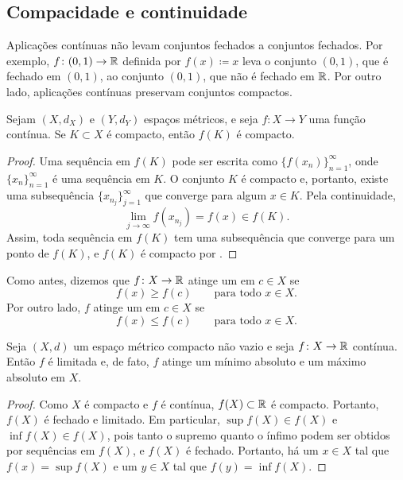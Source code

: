 \subsection{Compacidade e continuidade}

Aplicações contínuas não levam conjuntos fechados a conjuntos fechados. Por exemplo,
$f \colon (0,1) \to {\mathbb{R}}$ definida por $f(x) \coloneqq x$ leva o conjunto $(0,1)$, que
é fechado em $(0,1)$, ao conjunto $(0,1)$, que não é fechado em ${\mathbb{R}}$.
Por outro lado, aplicações contínuas preservam conjuntos compactos.

\begin{lemma} \label{lemma:continuouscompact}
Sejam $(X,d_X)$ e $(Y,d_Y)$ espaços métricos,
e seja $f \colon X \to Y$ uma função contínua. Se
$K \subset X$ é compacto, então $f(K)$ é compacto.
\end{lemma}

\begin{proof}
Uma sequência em $f(K)$ pode ser escrita como
$\bigl\{ f(x_n) \bigr\}_{n=1}^\infty$, onde
$\{ x_n \}_{n=1}^\infty$ é uma sequência em $K$. O conjunto $K$ é compacto e,
portanto, existe uma subsequência
$\{ x_{n_j} \}_{j=1}^\infty$ que converge para algum $x \in K$.
Pela continuidade,
\begin{equation*}
\lim_{j\to\infty} f(x_{n_j}) = f(x) \in f(K) .
\end{equation*}
Assim, toda sequência em $f(K)$ tem uma subsequência que converge
para um ponto de $f(K)$, e $f(K)$ é compacto por .
\end{proof}

Como antes, dizemos que $f \colon X \to {\mathbb{R}}$ atinge um
\emph{} em $c \in X$ se
\begin{equation*}
f(x) \geq f(c) \qquad \text{para todo } x \in X.
\end{equation*}
Por outro lado, $f$ atinge um
\emph{} em $c \in X$ se
\begin{equation*}
f(x) \leq f(c) \qquad \text{para todo } x \in X.
\end{equation*}

\begin{thm}
Seja $(X,d)$ um espaço métrico compacto não vazio
e seja $f \colon X \to {\mathbb{R}}$ contínua. Então
$f$ é limitada e, de fato,
$f$ atinge um mínimo absoluto e um máximo absoluto em $X$.
\end{thm}

\begin{proof}
Como $X$ é compacto e $f$ é contínua,
$f(X) \subset {\mathbb{R}}$ é compacto. Portanto, $f(X)$ é fechado
e limitado. Em particular,
$\sup f(X) \in f(X)$ e
$\inf f(X) \in f(X)$, pois tanto o supremo quanto o ínfimo
podem ser obtidos por sequências em $f(X)$, e $f(X)$ é fechado.
Portanto, há um $x \in X$ tal que $f(x) = \sup f(X)$
e um $y \in X$ tal que $f(y) = \inf f(X)$.
\end{proof}

